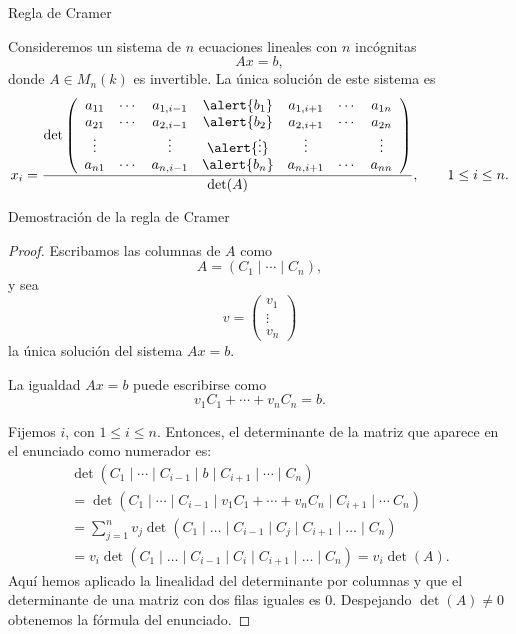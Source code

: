 \begin{frame}{Regla de Cramer}

\begin{theorem}
Consideremos un sistema de \(n\) ecuaciones lineales con \(n\)
incógnitas
\[
Ax=b,
\]
donde \(A\in M_n(k)\) es invertible. La única solución de este sistema es
\[x_i=\frac{
\det\left(
\begin{array}{ccccccc}
a_{11} & \cdots & a_{1,i-1} & \alert{b_1} & a_{1,i+1} & \cdots & a_{1n}\\
a_{21} & \cdots & a_{2,i-1} & \alert{b_2} & a_{2,i+1} & \cdots & a_{2n}\\
\vdots &        & \vdots    & \alert{\vdots} & \vdots    &        & \vdots\\
a_{n1} & \cdots & a_{n,i-1} & \alert{b_n} & a_{n,i+1} & \cdots & a_{nn}
\end{array}
\right)
}{\det(A)},\qquad 1\leq i\leq n.\]
\end{theorem}

\end{frame}

\begin{frame}[allowframebreaks, t]{Demostración de la regla de Cramer}

\begin{proof}
Escribamos las columnas de \(A\) como
\[
A=(C_1\mid \cdots\mid C_n),
\]
y sea
\[
v=
\begin{pmatrix}
v_1\\
\vdots\\
v_n
\end{pmatrix}
\]
la única solución del sistema \(Ax=b\).

\medskip

La igualdad \(Ax=b\) puede escribirse como
\[
v_1C_1+\cdots+v_nC_n=b.
\]

Fijemos \(i\), con \(1\leq i\leq n\). Entonces, el determinante de la matriz que aparece en el enunciado como numerador es:
\begin{multline*}
	\det
(C_1\mid \cdots\mid C_{i-1}\mid b\mid C_{i+1}\mid \cdots\mid C_n)
\\
=
\det (C_1\mid \cdots\mid C_{i-1}\mid v_1C_1+\cdots+v_nC_n\mid C_{i+1}\mid \cdots\ C_n)\\
=
\sum_{j=1}^n
v_j\det(C_1\mid \ldots\mid C_{i-1}\mid C_j\mid C_{i+1}\mid \ldots\mid C_n)\\
=
v_i\det(C_1\mid \ldots\mid C_{i-1}\mid C_i\mid C_{i+1}\mid \ldots\mid C_n)=v_i\det(A).
\end{multline*}
Aquí hemos aplicado la linealidad del determinante por columnas y que el determinante de una matriz con dos filas iguales es \(0\). 
Despejando $\det(A)\neq 0$ obtenemos la fórmula del enunciado.
\end{proof}

\end{frame}

